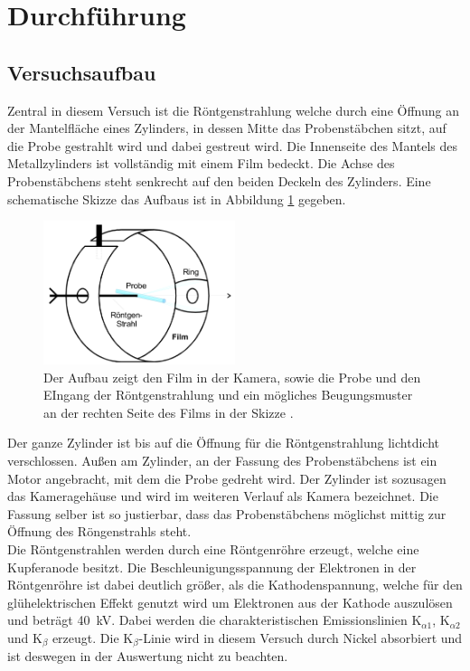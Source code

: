 \section{Durchführung}
\label{sec:Durchführung}
\subsection{Versuchsaufbau}
Zentral in diesem Versuch ist die Röntgenstrahlung welche durch eine Öffnung an der Mantelfläche eines Zylinders, in dessen Mitte das Probenstäbchen sitzt, auf die Probe gestrahlt wird und dabei gestreut wird. 
Die Innenseite des Mantels des Metallzylinders ist vollständig mit einem Film bedeckt.
Die Achse des Probenstäbchens steht senkrecht auf den beiden Deckeln des Zylinders. Eine schematische Skizze das Aufbaus ist in Abbildung \ref{fig:Aufbau} gegeben.
\begin{figure}
	\centering
	\includegraphics[width = 0.5\textwidth]{Abbildungen/Aufbau.png}
	\caption{Der Aufbau zeigt den Film in der Kamera, sowie die Probe und den EIngang der Röntgenstrahlung und ein mögliches Beugungsmuster an der rechten Seite des Films in der Skizze \cite{Anleitung}. }
	\label{fig:Aufbau}
\end{figure}  
Der ganze Zylinder ist bis auf die Öffnung für die Röntgenstrahlung lichtdicht verschlossen.
Außen am Zylinder, an der Fassung des Probenstäbchens ist ein Motor angebracht, mit dem die Probe gedreht wird.
Der Zylinder ist sozusagen das Kameragehäuse und wird im weiteren Verlauf als Kamera bezeichnet. 
Die Fassung selber ist so justierbar, dass das Probenstäbchens möglichst mittig zur Öffnung des Röngenstrahls steht.\\
Die Röntgenstrahlen werden durch eine Röntgenröhre erzeugt, welche eine Kupferanode besitzt.
Die Beschleunigungsspannung der Elektronen in der Röntgenröhre ist dabei deutlich größer, als die Kathodenspannung, welche für den glühelektrischen Effekt genutzt wird um Elektronen aus der Kathode auszulösen und beträgt \SI{40}{\kV}. 
Dabei werden die charakteristischen Emissionslinien K$_{\alpha 1}$, K$_{\alpha 2}$ und K$_\beta$ erzeugt. 
Die K$_\beta$-Linie wird in diesem Versuch durch Nickel absorbiert und ist deswegen in der Auswertung nicht zu beachten.\\

